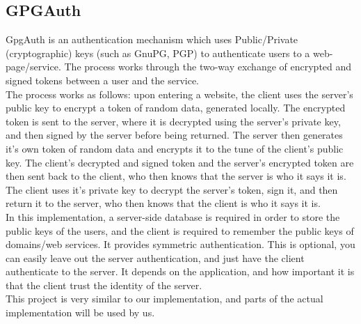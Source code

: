 \documentclass[11pt]{article}
\begin{document}
\subsection{GPGAuth} \label{subsec:gpgauth}
GpgAuth\cite{gpgauth} is an authentication mechanism which uses Public/Private (cryptographic) keys (such as GnuPG, PGP) to authenticate users to a web-page/service.  The process works through the two-way exchange of encrypted and signed tokens between a user and the service.\\
	The process works as follows: upon entering a website, the client uses the server's public key to encrypt a token of random data, generated locally.  The encrypted token is sent to the server, where it is decrypted using the server's private key, and then signed by the server before being returned.  The server then generates it's own token of random data and encrypts it to the tune of the client's public key.  The client's decrypted and signed token  and the server's encrypted token are then sent back to the client, who then knows that the server is who it says it is.  The client uses it's private key to decrypt the server's token, sign it, and then return it to the server, who then knows that the client is who it says it is.\\
	In this implementation, a server-side database is required in order to store the public keys of the users, and the client is required to remember the public keys of domains/web services. It provides symmetric authentication. This is optional, you can easily leave out the server authentication, and just have the client authenticate to the server. It depends on the application, and how important it is that the client trust the identity of the server.\\
	This project is very similar to our implementation, and parts of the actual implementation will be used by us.

\pagebreak

{}
\end{document}

